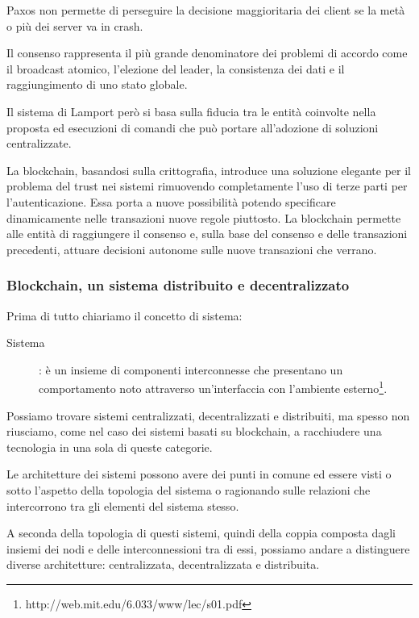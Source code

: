 	Paxos non permette di perseguire la decisione maggioritaria dei client se la metà o più dei server va in crash.  
	
	Il consenso rappresenta il più grande denominatore dei problemi di accordo come il broadcast atomico, l'elezione del leader, la consistenza dei dati e il raggiungimento di uno stato globale.
	
	Il sistema di Lamport però si basa sulla fiducia tra le entità coinvolte nella proposta ed esecuzioni di comandi che può portare all'adozione di soluzioni centralizzate.
	
	La blockchain, basandosi sulla crittografia, introduce una soluzione elegante per il problema del trust nei sistemi rimuovendo completamente l'uso di terze parti per l'autenticazione.
	Essa porta a nuove possibilità potendo specificare dinamicamente nelle transazioni nuove regole piuttosto. La blockchain permette alle entità di raggiungere il consenso e, sulla base del consenso e delle transazioni precedenti, attuare decisioni autonome sulle nuove transazioni che verrano.
	
	\subsubsection{Blockchain, un sistema distribuito e decentralizzato}
	
	
	Prima di tutto chiariamo il concetto di sistema: 
	
	\begin{description}
		\item[Sistema]: è un insieme di componenti interconnesse che presentano un comportamento noto attraverso un'interfaccia con l'ambiente esterno\footnote{http://web.mit.edu/6.033/www/lec/s01.pdf}.
	\end{description}
	
	Possiamo trovare sistemi centralizzati, decentralizzati e distribuiti, ma spesso non riusciamo, come nel caso dei sistemi basati su blockchain, a racchiudere una tecnologia in una sola di queste categorie.
	
	
	Le architetture dei sistemi possono avere dei punti in comune ed essere visti o sotto l'aspetto della topologia del sistema o ragionando sulle relazioni che intercorrono tra gli elementi del sistema stesso.
	
	A seconda della topologia di questi sistemi, quindi della coppia composta dagli insiemi dei nodi e delle interconnessioni tra di essi, possiamo andare a distinguere diverse architetture: centralizzata, decentralizzata e distribuita.
	
